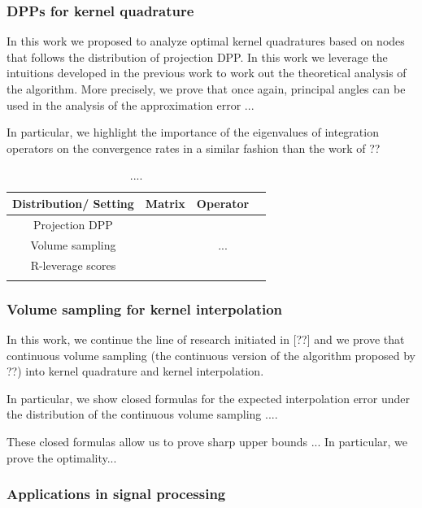 \documentclass[twoside,11pt]{book}
\numberwithin{theorem}{chapter}
\numberwithin{definition}{chapter}
\numberwithin{proposition}{chapter}
\numberwithin{corollary}{chapter}
\numberwithin{example}{chapter}
\numberwithin{lemma}{chapter}
\numberwithin{assumption}{chapter}
\begin{document}
\subsubsection{DPPs for kernel quadrature}

In this work we proposed to analyze optimal kernel quadratures based on nodes that follows the distribution of projection DPP. 
In this work we leverage the intuitions developed in the previous work to work out the theoretical analysis of the algorithm. More precisely, we prove that once again, principal angles can be used in the analysis of the approximation error ...

In particular, we highlight the importance of the eigenvalues of integration operators on the convergence rates in a similar fashion than the work of ??



\begin{table}
\centering
 \begin{tabular}{| c| c| c| c|}
 \hline
  Distribution/ Setting & Matrix & Operator\\
 \hline
 Projection DPP& \cite{BeBaCh18} & \cite{BeBaCh19} \\
 \hline
 Volume sampling& \cite{DRVW06} & ... \\
 \hline
 R-leverage scores & \cite{Bac13}  & \cite{Bac17}  \\
 &  \cite{AlMa15} &   \\
\hline
\end{tabular}
\caption{....\label{table:matrix_operator_duality}}
\end{table}


\subsubsection{Volume sampling for kernel interpolation}
In this work, we continue the line of research initiated in [??] and we prove that continuous volume sampling (the continuous version of the algorithm proposed by ??) into kernel quadrature and kernel interpolation.

In particular, we show closed formulas for the expected interpolation error under the distribution of the continuous volume sampling ....

These closed formulas allow us to prove sharp upper bounds ... In particular, we prove the optimality...

\subsubsection{Applications in signal processing}
\end{document}

